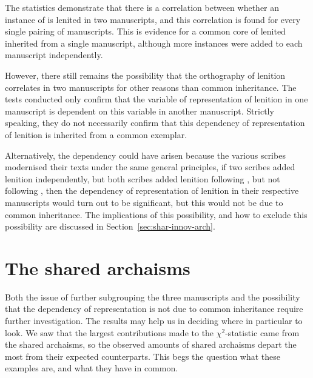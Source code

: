 The statistics demonstrate that there is a correlation between whether an instance of  is lenited in two manuscripts, and this correlation is found for every single pairing of manuscripts. This is evidence for a common core of lenited  inherited from a single manuscript, although more instances were added to each manuscript independently. 

However, there still remains the possibility that the orthography of lenition correlates in two manuscripts for other reasons than common inheritance. The tests conducted  only confirm that the variable of representation of lenition in one manuscript is dependent on this  variable in another manuscript. Strictly speaking, they do not necessarily confirm that this dependency of representation of lenition is inherited from a common exemplar.

Alternatively, the dependency could have arisen because the various scribes modernised their texts under the same general principles, \eg if two scribes added lenition independently, but both scribes added lenition following , but not following , then the dependency of representation of lenition in their respective manuscripts would turn out to be significant, but this would not be due to common inheritance. The implications of this possibility, and how to exclude this possibility are discussed in Section~\ref{sec:shar-innov-arch}. 


\section{The shared archaisms}
\label{sec:beyond-stat-again}

Both the issue of further subgrouping the three manuscripts and the  possibility that the dependency of representation is not due to common inheritance require further investigation. The results may help us in deciding where in particular to look. We saw that the largest contributions made to the \(\chi^2\)-statistic came from the shared archaisms, so the observed amounts of shared archaisms depart the most from their expected counterparts. This begs the question what these examples are, and what they have in common. 


